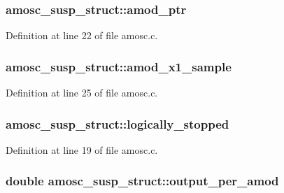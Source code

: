\subsubsection[{\texorpdfstring{amod\+\_\+ptr}{amod_ptr}}]{ amosc\+\_\+susp\+\_\+struct\+::amod\+\_\+ptr}\hypertarget{structamosc__susp__struct_a5d95c0dec564bbb99265798070e76374}{}\label{structamosc__susp__struct_a5d95c0dec564bbb99265798070e76374}


Definition at line 22 of file amosc.\+c.

\subsubsection[{\texorpdfstring{amod\+\_\+x1\+\_\+sample}{amod_x1_sample}}]{ amosc\+\_\+susp\+\_\+struct\+::amod\+\_\+x1\+\_\+sample}\hypertarget{structamosc__susp__struct_ae0be4c3a135b2bb78602586439a3aa0f}{}\label{structamosc__susp__struct_ae0be4c3a135b2bb78602586439a3aa0f}


Definition at line 25 of file amosc.\+c.

\subsubsection[{\texorpdfstring{logically\+\_\+stopped}{logically_stopped}}]{ amosc\+\_\+susp\+\_\+struct\+::logically\+\_\+stopped}\hypertarget{structamosc__susp__struct_a54009805e83cb1edce8dadd48de166e5}{}\label{structamosc__susp__struct_a54009805e83cb1edce8dadd48de166e5}


Definition at line 19 of file amosc.\+c.

\subsubsection[{\texorpdfstring{output\+\_\+per\+\_\+amod}{output_per_amod}}]{\setlength{\rightskip}{0pt plus 5cm}double amosc\+\_\+susp\+\_\+struct\+::output\+\_\+per\+\_\+amod}\hypertarget{structamosc__susp__struct_a660aa2f2407f2ccb69998e2abc194ac1}{}\label{structamosc__susp__struct_a660aa2f2407f2ccb69998e2abc194ac1}


